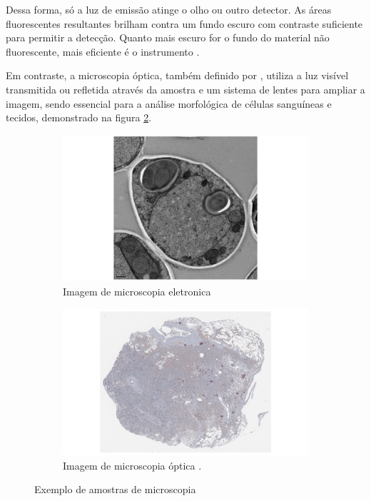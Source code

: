 Dessa forma, só a luz de emissão atinge o olho ou outro detector. As áreas fluorescentes resultantes brilham contra um fundo escuro com contraste suficiente para permitir a detecção. Quanto mais escuro for o fundo do material não fluorescente, mais eficiente é o instrumento \cite{gonzalez2008digital}.

Em contraste, a microscopia óptica, também definido por , utiliza a luz visível transmitida ou refletida através da amostra e um sistema de lentes para ampliar a imagem, sendo essencial para a análise morfológica de células sanguíneas e tecidos, demonstrado na figura \ref{fig: opticalmicro}.


\begin{figure}[h]
  \begin{subfigure}{0.5\textwidth}
    \includegraphics[scale=0.16]{images/electron_micro} 
    \caption{Imagem de microscopia eletronica \cite{eletron-micro}}
    \label{fig: electronmicro}
  \end{subfigure}
  \begin{subfigure}{0.5\textwidth}
    \includegraphics[scale=0.16]{images/lung06}
    \caption{ Imagem de microscopia óptica \cite{Schaadt2020}.}
    \label{fig: opticalmicro}
  \end{subfigure}
\caption{Exemplo de amostras de microscopia}
\label{fig: microimg}
\end{figure}


